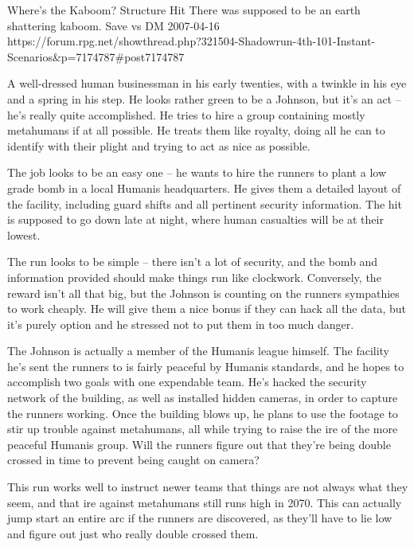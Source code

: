\begin{scenario}{Where’s the Kaboom?}
	{Structure Hit}
	{There was supposed to be an earth shattering kaboom.}
	{Save vs DM}
	{2007-04-16}
	{https://forum.rpg.net/showthread.php?321504-Shadowrun-4th-101-Instant-Scenarios\&p=7174787\#post7174787}

 A well-dressed human businessman in his early twenties, with a twinkle in his eye and a spring in his step. He looks rather green to be a Johnson, but it’s an act – he’s really quite accomplished. He tries to hire a group containing mostly metahumans if at all possible. He treats them like royalty, doing all he can to identify with their plight and trying to act as nice as possible.

\synopsis The job looks to be an easy one – he wants to hire the runners to plant a low grade bomb in a local Humanis headquarters. He gives them a detailed layout of the facility, including guard shifts and all pertinent security information. The hit is supposed to go down late at night, where human casualties will be at their lowest.

The run looks to be simple – there isn’t a lot of security, and the bomb and information provided should make things run like clockwork. Conversely, the reward isn’t all that big, but the Johnson is counting on the runners sympathies to work cheaply. He will give them a nice bonus if they can hack all the data, but it’s purely option and he stressed not to put them in too much danger.

\twist The Johnson is actually a member of the Humanis league himself. The facility he’s sent the runners to is fairly peaceful by Humanis standards, and he hopes to accomplish two goals with one expendable team. He’s hacked the security network of the building, as well as installed hidden cameras, in order to capture the runners working. Once the building blows up, he plans to use the footage to stir up trouble against metahumans, all while trying to raise the ire of the more peaceful Humanis group. Will the runners figure out that they’re being double crossed in time to prevent being caught on camera?

\notes This run works well to instruct newer teams that things are not always what they seem, and that ire against metahumans still runs high in 2070. This can actually jump start an entire arc if the runners are discovered, as they’ll have to lie low and figure out just who really double crossed them.

\end{scenario}
